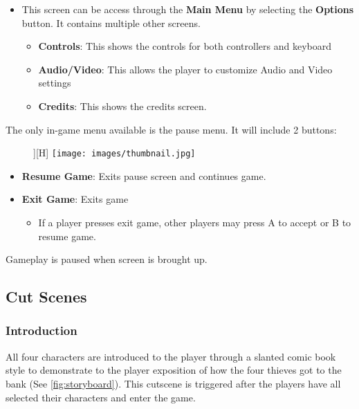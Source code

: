 \documentclass[10pt]{report}
\begin{document}
\begin{itemize}
    \item This screen can be access through the \textbf{Main Menu} by selecting the \textbf{Options} button. It contains multiple other screens.
    \begin{itemize}
        \item \textbf{Controls}: This shows the controls for both controllers and keyboard
        \item \textbf{Audio/Video}: This allows the player to customize Audio and Video settings
        \item \textbf{Credits}: This shows the credits screen.    
    \end{itemize}
\end{itemize}


The only in-game menu available is the pause menu. It will include 2 buttons:

\begin{figure}][H]
    \centering
    \texttt{[image: images/thumbnail.jpg]}
    \caption{}
\end{figure}

\begin{itemize}
    \item \textbf{Resume Game}: Exits pause screen and continues game.
    \item \textbf{Exit Game}: Exits game
    \begin{itemize}
        \item If a player presses exit game, other players may press A to accept or B to resume game.
    \end{itemize}
\end{itemize}

Gameplay is paused when screen is brought up.

\subsection{Cut Scenes}

\subsubsection{Introduction}

All four characters are introduced to the player through a slanted comic book style to demonstrate to the player exposition of how the four thieves got to the bank (See \ref{fig:storyboard}). This cutscene is triggered after the players have all selected their characters and enter the game.
\end{document}

